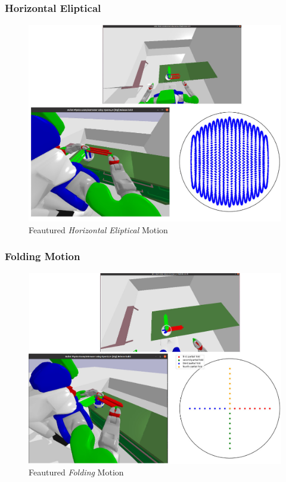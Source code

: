 \subsubsection{Horizontal Eliptical}
\begin{figure}[H]
    \centering
    \includegraphics[scale=0.27]{Graphics/horizontal_showcase.jpg}
    \caption{Feautured \textit{Horizontal Eliptical} Motion}
    \label{fig:circularshowcase}
\end{figure}

\subsubsection{Folding Motion}
\begin{figure}[H]
    \centering
    \includegraphics[scale=0.27]{Graphics/folding_showcase.jpg}
    \caption{Feautured \textit{Folding} Motion}
    \label{fig:foldingshowcase}
\end{figure} 

